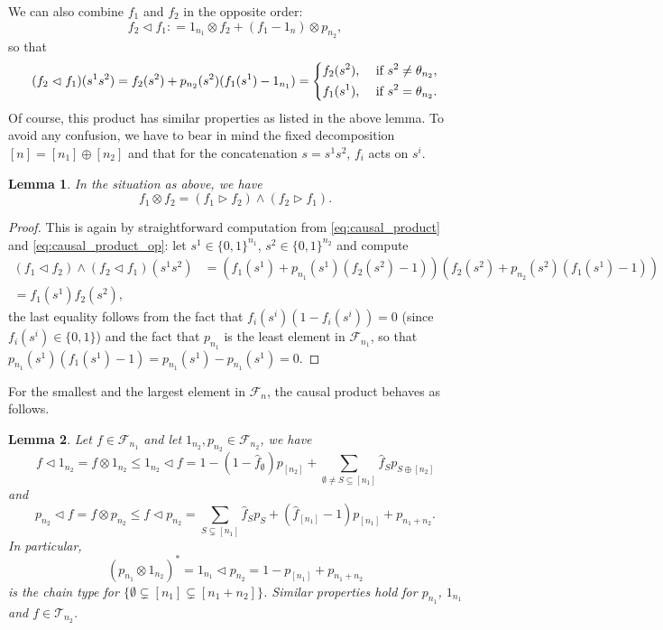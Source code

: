 \documentclass[12pt]{article}
\newtheorem{lemma}{Lemma}
\theoremstyle{definition}
\theoremstyle{remark}
\def\Te{\mathcal T}
\def\Fe{\mathcal F}
\def\vtl{\vartriangleleft}
\def\vtr{\vartriangleright}
\begin{document}
We can also combine $f_1$ and $f_2$ in the opposite order:
\[
f_2\vtl f_1: =1_{n_1}\otimes f_2+(f_1-1_n)\otimes p_{n_2},
\]
so that
\begin{equation}\label{eq:causal_product_op}
(f_2\vtl f_1)(s^1s^2)=f_2(s^2)+p_{n_2}(s^2)(f_1(s^1)-1_{n_1})=\begin{dcases} f_2(s^2), & \text{ if }
s^2\ne \theta_{n_2},\\
   f_1(s^1), & \text{ if } s^2=\theta_{n_2}.
   \end{dcases}
\end{equation}
Of course, this product has similar properties as listed in the above lemma.
To avoid any confusion, we have to bear in mind the fixed decomposition $[n]=[n_1]\oplus
[n_2]$ and that for the concatenation $s=s^1s^2$, $f_i$ acts on $s^i$. 

\begin{lemma}\label{lemma:causal_tensor} In the situation as above, we have
\[
f_1\otimes f_2 = (f_1\vtr f_2)\wedge (f_2\vtr f_1).
\]

\end{lemma}


\begin{proof} This is again by straightforward computation from \eqref{eq:causal_product}
and \eqref{eq:causal_product_op}: let
$s^1\in \{0,1\}^{n_1}$, $s^2\in \{0,1\}^{n_2}$ and compute
\begin{align*}
(f_1\vtl f_2)\wedge (f_2\vtl
f_1)(s^1s^2)&=\left(f_1(s^1)+p_{n_1}(s^1)(f_2(s^2)-1)\right)\left(f_2(s^2)+p_{n_2}(s^2)(f_1(s^1)-1)\right)\\
=f_1(s^1)f_2(s^2),
\end{align*}
the last equality follows from the fact that $f_i(s^i)(1-f_i(s^i))=0$ (since $f_i(s^i)\in
\{0,1\}$) and the fact that $p_{n_1}$ is the least element in $\Fe_{n_1}$, so that
$p_{n_1}(s^1)(f_1(s^1)-1)=p_{n_1}(s^1)-p_{n_1}(s^1)=0$. 

\end{proof}

For the smallest and the largest element in $\Fe_n$, the causal product behaves as
follows.
\begin{lemma}\label{lemma:onechain_causal}
Let  $f\in \Fe_{n_1}$ and let $1_{n_2}, p_{n_2}\in \Fe_{n_2}$, we have
\[
f\vtl 1_{n_2}= f\otimes 1_{n_2}\le 1_{n_2}\vtl f =1-(1-\hat
f_\emptyset)p_{[n_2]}+\sum_{\emptyset \ne S\subseteq [n_1]} \hat f_S p_{S\oplus [n_2]}
\]
and
\[
p_{n_2} \vtl f= f \otimes p_{n_2}\le f\vtl p_{n_2}=\sum_{S\subsetneq [n_1]} \hat
f_Sp_S+(\hat f_{[n_1]}-1)p_{[n_1]}+p_{n_1+n_2}.
\]
In particular,
\[
(p_{n_1}\otimes 1_{n_2})^*=1_{n_1}\vtl p_{n_2}=1-p_{[n_1]}+p_{n_1+n_2}
\]
is the chain type for $\{\emptyset\subsetneq [n_1]\subsetneq [n_1+n_2]\}$. Similar
properties hold for $p_{n_1}$, $1_{n_1}$ and $f\in \Te_{n_2}$.
\end{lemma}
\end{document}

